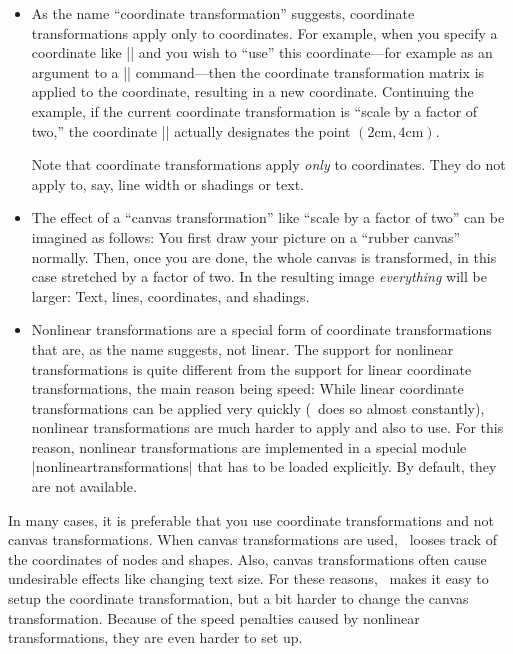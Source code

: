 \begin{itemize}
\item
  As the name ``coordinate transformation'' suggests, coordinate
  transformations apply only to coordinates. For example, when you
  specify a coordinate like |\pgfpoint{1cm}{2cm}| and you wish to
  ``use'' this coordinate---for example as an argument to a
  |\pgfpathmoveto| command---then the coordinate transformation matrix
  is applied to the coordinate, resulting in a new
  coordinate. Continuing the example, if the current coordinate
  transformation is ``scale by a factor of two,'' the coordinate
  |\pgfpoint{1cm}{2cm}| actually designates the point
  $(2\mathrm{cm},4\mathrm{cm})$. 

  Note that coordinate transformations apply \emph{only} to
  coordinates. They do not apply to, say, line width or shadings or
  text.
\item
  The effect of a ``canvas transformation'' like ``scale by a factor
  of two'' can be imagined as follows: You first draw your picture on
  a ``rubber canvas'' normally. Then, once you are done, the whole
  canvas is transformed, in this case stretched by a factor of
  two. In the resulting image \emph{everything} will be larger: Text,
  lines, coordinates, and shadings.
\item
  Nonlinear transformations are a special form of coordinate
  transformations that are, as the name suggests, not linear. The
  support for nonlinear transformations is quite different from the
  support for linear coordinate transformations, the main reason being
  speed: While linear coordinate transformations can be applied very
  quickly (\pgfname\ does so almost constantly), nonlinear
  transformations are much harder to apply and also to use. For this
  reason, nonlinear transformations are implemented in a special
  module |nonlineartransformations| that has to be loaded
  explicitly. By default, they are not available.
\end{itemize}

In many cases, it is preferable that you use coordinate
transformations and not canvas transformations. When canvas
transformations are used, \pgfname\ looses track of the coordinates of
nodes and shapes. Also, canvas transformations often cause undesirable
effects like changing text size. For these reasons, \pgfname\ makes it
easy to setup the coordinate transformation, but a bit harder to
change the canvas transformation. Because of the speed penalties
caused by nonlinear transformations, they are even harder to set up.


